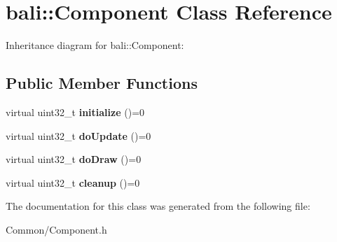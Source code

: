 \hypertarget{classbali_1_1_component}{\section{bali\-:\-:Component Class Reference}
\label{classbali_1_1_component}
}


Inheritance diagram for bali\-:\-:Component\-:
\subsection*{Public Member Functions}
\begin{DoxyCompactItemize}
\item 
\hypertarget{classbali_1_1_component_af878b329160aafd83201a7a372d8de8c}{virtual uint32\-\_\-t {\bfseries initialize} ()=0}\label{classbali_1_1_component_af878b329160aafd83201a7a372d8de8c}

\item 
\hypertarget{classbali_1_1_component_a67d2602fc2a5fd451d494d45368abc71}{virtual uint32\-\_\-t {\bfseries do\-Update} ()=0}\label{classbali_1_1_component_a67d2602fc2a5fd451d494d45368abc71}

\item 
\hypertarget{classbali_1_1_component_a78b80c9887990954cfccdebad48029c2}{virtual uint32\-\_\-t {\bfseries do\-Draw} ()=0}\label{classbali_1_1_component_a78b80c9887990954cfccdebad48029c2}

\item 
\hypertarget{classbali_1_1_component_a99826559d29c6a493a5b313c16541dc6}{virtual uint32\-\_\-t {\bfseries cleanup} ()=0}\label{classbali_1_1_component_a99826559d29c6a493a5b313c16541dc6}

\end{DoxyCompactItemize}


The documentation for this class was generated from the following file\-:\begin{DoxyCompactItemize}
\item 
Common/Component.\-h\end{DoxyCompactItemize}
